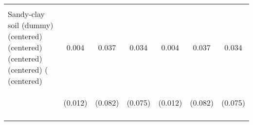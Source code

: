 \begin{center}
\begin{tabular}{lcccccc}
\vspace{4pt} & \begin{footnotesize}[0.237]\end{footnotesize} & \begin{footnotesize}[0.111]\end{footnotesize} & \begin{footnotesize}[0.098]\end{footnotesize} & \begin{footnotesize}[0.237]\end{footnotesize} & \begin{footnotesize}[0.111]\end{footnotesize} & \begin{footnotesize}[0.098]\end{footnotesize} \\
Sandy-clay soil (dummy) (centered) (centered) (centered) (centered) ( (centered) & 0.004 & 0.037 & 0.034 & 0.004 & 0.037 & 0.034 \\
 & \begin{footnotesize}(0.012)\end{footnotesize} & \begin{footnotesize}(0.082)\end{footnotesize} & \begin{footnotesize}(0.075)\end{footnotesize} & \begin{footnotesize}(0.012)\end{footnotesize} & \begin{footnotesize}(0.082)\end{footnotesize} & \begin{footnotesize}(0.075)\end{footnotesize} \\
\vspace{4pt} & \begin{footnotesize}[0.768]\end{footnotesize} & \begin{footnotesize}[0.654]\end{footnotesize} & \begin{footnotesize}[0.651]\end{footnotesize} & \begin{footnotesize}[0.768]\end{footnotesize} & \begin{footnotesize}[0.654]\end{footnotesize} & \begin{footnotesize}[0.651]\end{footnotesize} \\

\end{tabular}
\end{center}
